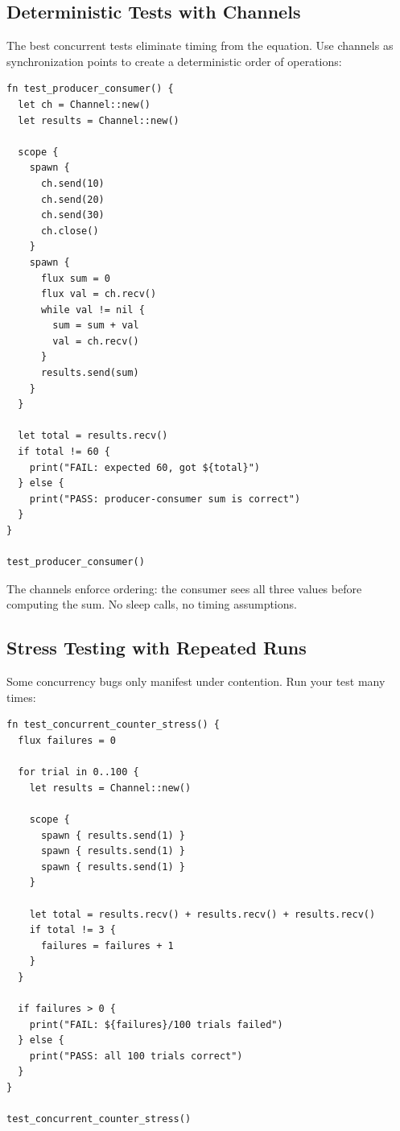 \subsection{Deterministic Tests with Channels}

The best concurrent tests eliminate timing from the equation.
Use channels as synchronization points to create a deterministic order of operations:

\begin{lstlisting}[language=Lattice, caption={Deterministic concurrent test}]
fn test_producer_consumer() {
  let ch = Channel::new()
  let results = Channel::new()

  scope {
    spawn {
      ch.send(10)
      ch.send(20)
      ch.send(30)
      ch.close()
    }
    spawn {
      flux sum = 0
      flux val = ch.recv()
      while val != nil {
        sum = sum + val
        val = ch.recv()
      }
      results.send(sum)
    }
  }

  let total = results.recv()
  if total != 60 {
    print("FAIL: expected 60, got ${total}")
  } else {
    print("PASS: producer-consumer sum is correct")
  }
}

test_producer_consumer()
\end{lstlisting}

The channels enforce ordering: the consumer sees all three values before computing the sum.
No sleep calls, no timing assumptions.

\subsection{Stress Testing with Repeated Runs}

Some concurrency bugs only manifest under contention.
Run your test many times:

\begin{lstlisting}[language=Lattice, caption={Stress test via repeated runs}]
fn test_concurrent_counter_stress() {
  flux failures = 0

  for trial in 0..100 {
    let results = Channel::new()

    scope {
      spawn { results.send(1) }
      spawn { results.send(1) }
      spawn { results.send(1) }
    }

    let total = results.recv() + results.recv() + results.recv()
    if total != 3 {
      failures = failures + 1
    }
  }

  if failures > 0 {
    print("FAIL: ${failures}/100 trials failed")
  } else {
    print("PASS: all 100 trials correct")
  }
}

test_concurrent_counter_stress()
\end{lstlisting}

